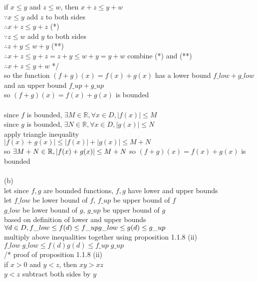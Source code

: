\documentclass[12pt, border = 4pt, multi]{article} %
\begin{document}
if $x \leq y$ and $z \leq w$, then $x + z \leq y + w$\\
$\because x \leq y$ \qquad add $z$ to both sides\\
$\therefore x + z \leq y + z$ \qquad (*)\\
$\because z \leq w$ \qquad add $y$ to both sides\\
$\therefore z + y \leq w + y$ \qquad (**)\\
$\therefore x + z \leq y + z = z + y \leq w + y = y + w$ \qquad combine (*) and (**)\\ 
$\therefore x + z \leq y + w$ */\\
so the function $(f + g)(x) = f(x) + g(x)$ has a lower bound $f\_low + g\_low$ and an upper bound $f\_up + g\_up$\\
so $(f + g)(x) = f(x) + g(x)$ is bounded\\
\\
since $f$ is bounded, $\exists M \in \mathbb{R}, \forall x \in D, |f(x)| \leq M$\\
since $g$ is bounded, $\exists N \in \mathbb{R}, \forall x \in D, |g(x)| \leq N$\\
apply triangle inequality\\
$|f(x) + g(x)| \leq |f(x)| + |g(x)| \leq M + N$\\
so $\exists M + N \in \mathbb{R}, |f(x) + g(x)| \leq M + N\\$
so $(f + g)(x) = f(x) + g(x)$ is bounded\\
\\
(b)\\
let since $f, g$ are bounded functions, $f, g$ have lower and upper bounds\\
let $f\_low$ be lower bound of $f$, $f\_up$ be upper bound of $f$\\
$g\_low$ be lower bound of $g$, $g\_up$ be upper bound of $g$\\
based on definition of lower and upper bounds\\
$\forall d \in D, f\_low \leq f(d) \leq f\_up\\
g\_low \leq g(d) \leq g\_up$\\
multiply above inequalities together using proposition 1.1.8 (ii)\\
$f\_low\;g\_low\leq f(d) g(d) \leq f\_up\;g\_up$\\
/* proof of proposition 1.1.8 (ii)\\
if $x > 0$ and $y < z$, then $xy > xz$\\
$y < z$ \qquad subtract both sides by $y$\\
\end{document}
